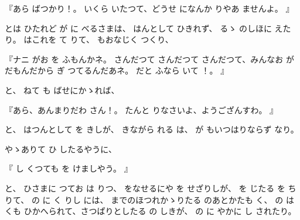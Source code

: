 
『あら
ばつかり！。
いくら
いたつて、どうせ
になんか
りやあ
ませんよ。
』

とは
ひたれど
が
に
べるさまは、
はんとして
ひきれず、
るゝ
のしほに
えたり。
はこれを
て
りて、
もおなじく
つくり、

『ナニ
がお
を
ふもんかネ。
さんだつて
さんだつて
さんだつて、みんなお
が
だもんだから
ぎ
つてるんだあネ。
だと
ふなら
いて
！。
』

と、
ねて
も
ばせにかゝれば、

『あら、あんまりだわ
さん！。
たんと
りなさいよ、ようござんすわ。
』

と、
はつんとして
を
きしが、
きながら
れる
は、
が
もいつはりならず
なり。

やゝありて
ひ
したるやうに、

『
し
くつても
を
けましやう。
』

と、
ひさまに
つてお
は
りつ、
をなせるにや
を
せざりしが、
を
じたる
を
ち
りて、
の
に
く
りし
には、
までのほつれかゝりたる
のあとかたも
く、
の
は
くも
ひかへられて、さつぱりとしたる
の
しきが、
の
に
やかに
し
されたり。

